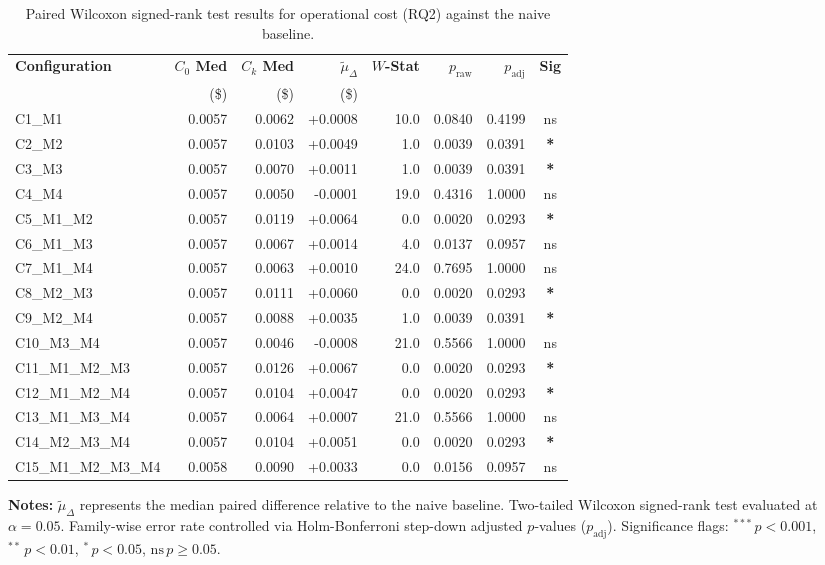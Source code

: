 \begin{table}[!htbp]
\centering
\small
\caption{Paired Wilcoxon signed-rank test results for operational cost (RQ2) against the naive baseline.}
\label{tab:wilcoxon_rq2}
\begin{tabular*}{\textwidth}{@{\extracolsep{\fill}} l r r r r r r c @{}}
\toprule
\textbf{Configuration} & \textbf{$C_0$ Med} & \textbf{$C_k$ Med} & \textbf{$\tilde{\mu}_\Delta$} & \textbf{$W$-Stat} & \textbf{$p_{\text{raw}}$} & \textbf{$p_{\text{adj}}$} & \textbf{Sig} \\
 & \scriptsize{(\$)} & \scriptsize{(\$)} & \scriptsize{(\$)} & & & & \\
\midrule
C1\_M1 & 0.0057 & 0.0062 & +0.0008 & 10.0 & 0.0840 & 0.4199 & ns \\
C2\_M2 & 0.0057 & 0.0103 & +0.0049 & 1.0 & 0.0039 & 0.0391 & \textbf{*} \\
C3\_M3 & 0.0057 & 0.0070 & +0.0011 & 1.0 & 0.0039 & 0.0391 & \textbf{*} \\
C4\_M4 & 0.0057 & 0.0050 & -0.0001 & 19.0 & 0.4316 & 1.0000 & ns \\
C5\_M1\_M2 & 0.0057 & 0.0119 & +0.0064 & 0.0 & 0.0020 & 0.0293 & \textbf{*} \\
C6\_M1\_M3 & 0.0057 & 0.0067 & +0.0014 & 4.0 & 0.0137 & 0.0957 & ns \\
C7\_M1\_M4 & 0.0057 & 0.0063 & +0.0010 & 24.0 & 0.7695 & 1.0000 & ns \\
C8\_M2\_M3 & 0.0057 & 0.0111 & +0.0060 & 0.0 & 0.0020 & 0.0293 & \textbf{*} \\
C9\_M2\_M4 & 0.0057 & 0.0088 & +0.0035 & 1.0 & 0.0039 & 0.0391 & \textbf{*} \\
C10\_M3\_M4 & 0.0057 & 0.0046 & -0.0008 & 21.0 & 0.5566 & 1.0000 & ns \\
C11\_M1\_M2\_M3 & 0.0057 & 0.0126 & +0.0067 & 0.0 & 0.0020 & 0.0293 & \textbf{*} \\
C12\_M1\_M2\_M4 & 0.0057 & 0.0104 & +0.0047 & 0.0 & 0.0020 & 0.0293 & \textbf{*} \\
C13\_M1\_M3\_M4 & 0.0057 & 0.0064 & +0.0007 & 21.0 & 0.5566 & 1.0000 & ns \\
C14\_M2\_M3\_M4 & 0.0057 & 0.0104 & +0.0051 & 0.0 & 0.0020 & 0.0293 & \textbf{*} \\
C15\_M1\_M2\_M3\_M4 & 0.0058 & 0.0090 & +0.0033 & 0.0 & 0.0156 & 0.0957 & ns \\
\bottomrule
\end{tabular*}
\vspace{0.5em}
\parbox{\textwidth}{\footnotesize
\textbf{Notes:} $\tilde{\mu}_\Delta$ represents the median paired difference relative to the naive baseline. Two-tailed Wilcoxon signed-rank test evaluated at $\alpha = 0.05$. Family-wise error rate controlled via Holm-Bonferroni step-down adjusted $p$-values ($p_{\text{adj}}$). Significance flags: $^{***}\,p < 0.001$, $^{**}\,p < 0.01$, $^{*}\,p < 0.05$, $\text{ns}\,p \ge 0.05$.}
\end{table}
